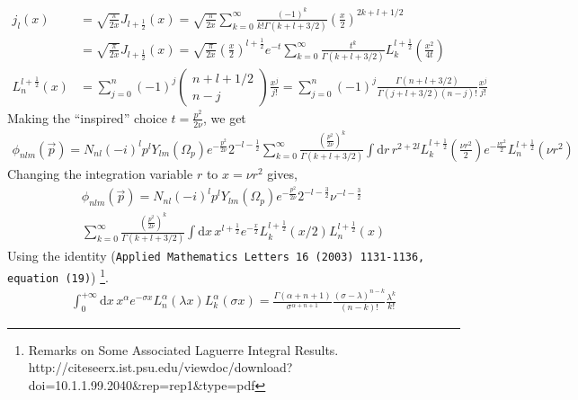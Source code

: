 \documentclass[10pt]{article}
\begin{document}
\begin{align*}
	j_l(x) &= \sqrt{ \frac{\pi}{2 x}} J_{l+\frac{1}{2}}(x) = \sqrt{ \frac{\pi}{2 x}} \sum_{k=0}^{\infty} \frac{ (-1)^{k}}{k! \Gamma(k+l+3/2)} \left(\frac{x}{2}\right)^{2k+l+1/2} \\
	&= \sqrt{ \frac{\pi}{2 x}} J_{l+\frac{1}{2}}(x) = \sqrt{ \frac{\pi}{2 x}} \left( \frac{x}{2} \right)^{l+\frac{1}{2}} e^{-t} \sum_{k=0}^{\infty} \frac{t^k}{\Gamma(k+l+3/2)} L^{l+\frac{1}{2}}_{k}\left( \frac{x^{2}}{4t} \right) \\
	L_{n}^{l+\frac{1}{2}}(x) &= \sum_{j=0}^{n} (-1)^{j} \left( \begin{array}{c} n + l +1/2 \\ n - j \end{array} \right) \frac{x^j}{j!} = \sum_{j=0}^{n} (-1)^{j} \frac{ \Gamma(n+l+3/2)}{\Gamma(j+l+3/2) (n-j)!} \frac{x^j}{j!}
\end{align*}
Making the ``inspired'' choice $t= \frac{p^{2}}{2 \nu}$, we get
\begin{multline*}
	\phi_{n l m}(\vec{p}) = N_{nl} (-i)^{l} p^{l}  Y_{l m}(\Omega_p) e^{-\frac{p^{2}}{2 \nu}} 2^{-l-\frac{1}{2}} \sum_{k=0}^{\infty}  \frac{\left( \frac{p^{2}}{2 \nu} \right)^{k}}{\Gamma(k+l+3/2)} \int \text{d}r \, r^{2+2l} L_{k}^{l+\frac{1}{2}} ( \frac{\nu r^{2}}{2} ) e^{-\frac{\nu r^{2}}{2}} L_{n}^{l+\frac{1}{2}}( \nu r^{2}) 
\end{multline*}
Changing the integration variable $r$ to $x= \nu r^{2}$ gives,
\begin{multline*}
	\phi_{n l m}(\vec{p}) = N_{nl} (-i)^{l} p^{l}  Y_{l m}(\Omega_p) e^{-\frac{p^{2}}{2 \nu}} 2^{-l-\frac{3}{2}} \nu^{-l-\frac{3}{2}} \\
	 \sum_{k=0}^{\infty}  \frac{\left( \frac{p^{2}}{2 \nu} \right)^{k}}{\Gamma(k+l+3/2)} \int \text{d}x \, x^{l+\frac{1}{2}}  e^{-\frac{x}{2}} L_{k}^{l+\frac{1}{2}} \left( x/2 \right) L_{n}^{l+\frac{1}{2}}(x) 
\end{multline*}
Using the identity (\texttt{Applied Mathematics Letters 16 (2003) 1131-1136, equation (19)}) \footnote{ Remarks on Some Associated Laguerre Integral Results. \\ http://citeseerx.ist.psu.edu/viewdoc/download?doi=10.1.1.99.2040\&rep=rep1\&type=pdf }.
\begin{align*}
	\int_{0}^{+\infty} \text{d} x \, x^{\alpha} e^{-\sigma x} L_{n}^{\alpha}(\lambda x) L_{k}^{\alpha}( \sigma x) = \frac{\Gamma(\alpha+n+1)}{\sigma^{\alpha+n+1}} \frac{(\sigma - \lambda)^{n-k}}{(n-k)!} \frac{\lambda^{k}}{k!}
\end{align*}
\end{document}
